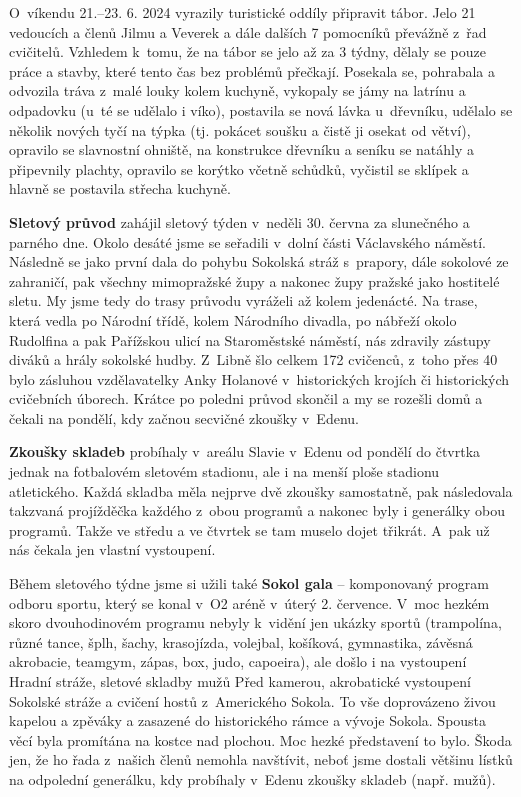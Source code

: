 \documentclass[11pt]{article}
\begin{document}
O~víkendu 21.–23. 6. 2024 vyrazily turistické oddíly připravit tábor. Jelo 21 vedoucích a členů Jilmu a Veverek a dále dalších 7 pomocníků převážně z~řad cvičitelů. Vzhledem k~tomu, že na tábor se jelo až za 3 týdny, dělaly se pouze práce a stavby, které tento čas bez problémů přečkají. Posekala se, pohrabala a odvozila tráva z~malé louky kolem kuchyně, vykopaly se jámy na latrínu a odpadovku (u~té se udělalo i víko), postavila se nová lávka u~dřevníku, udělalo se několik nových tyčí na týpka (tj. pokácet soušku a čistě ji osekat od větví), opravilo se slavnostní ohniště, na konstrukce dřevníku a seníku se natáhly a připevnily plachty, opravilo se korýtko včetně schůdků, vyčistil se sklípek a hlavně se postavila střecha kuchyně.

\textbf{Sletový průvod} zahájil sletový týden v~neděli 30. června za slunečného a parného dne. Okolo desáté jsme se seřadili v~dolní části Václavského náměstí. Následně se jako první dala do pohybu Sokolská stráž s~prapory, dále sokolové ze zahraničí, pak všechny mimopražské župy a nakonec župy pražské jako hostitelé sletu. My jsme tedy do trasy průvodu vyráželi až kolem jedenácté. Na trase, která vedla po Národní třídě, kolem Národního divadla, po nábřeží okolo Rudolfina a pak Pařížskou ulicí na Staroměstské náměstí, nás zdravily zástupy diváků a hrály sokolské hudby. Z~Libně šlo celkem 172 cvičenců, z~toho přes 40 bylo zásluhou vzdělavatelky Anky Holanové v~historických krojích či historických cvičebních úborech. Krátce po poledni průvod skončil a my se rozešli domů a čekali na pondělí, kdy začnou secvičné zkoušky v~Edenu.

\textbf{Zkoušky skladeb} probíhaly v~areálu Slavie v~Edenu od pondělí do čtvrtka jednak na fotbalovém sletovém stadionu, ale i na menší ploše stadionu atletického. Každá skladba měla nejprve dvě zkoušky samostatně, pak následovala takzvaná projížděčka každého z~obou programů a nakonec byly i generálky obou programů. Takže ve středu a ve čtvrtek se tam muselo dojet třikrát. A~pak už nás čekala jen vlastní vystoupení.

Během sletového týdne jsme si užili také \textbf{Sokol gala} – komponovaný program odboru sportu, který se konal v~O2 aréně v~úterý 2. července. V~moc hezkém skoro dvouhodinovém programu nebyly k~vidění jen ukázky sportů (trampolína, různé tance, šplh, šachy, krasojízda, volejbal, košíková, gymnastika, závěsná akrobacie, teamgym, zápas, box, judo, capoeira), ale došlo i na vystoupení Hradní stráže, sletové skladby mužů Před kamerou, akrobatické vystoupení Sokolské stráže a cvičení hostů z~Amerického Sokola. To vše doprovázeno živou kapelou a zpěváky a zasazené do historického rámce a vývoje Sokola. Spousta věcí byla promítána na kostce nad plochou. Moc hezké představení to bylo. Škoda jen, že ho řada z~našich členů nemohla navštívit, neboť jsme dostali většinu lístků na odpolední generálku, kdy probíhaly v~Edenu zkoušky skladeb (např.  mužů). 
\end{document}

